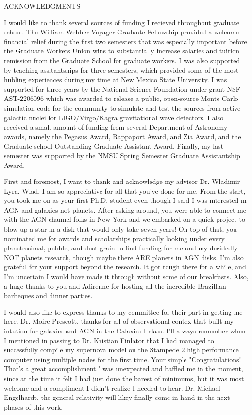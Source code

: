\begin{center}
ACKNOWLEDGMENTS
\end{center}


I would like to thank several sources of funding I recieved throughout graduate school.
The William Webber Voyager Graduate Fellowship provided a welcome financial relief during the first two semesters that was especially important before the Graduate Workers Union wins to substantially increase salaries and tuition remission from the Graduate School for graduate workers.
I was also supported by teaching assitantships for three semesters, which provided some of the most hubling experiences during my time at New Mexico State University.
I was supported for three years by the National Science Foundation under grant NSF AST-2206096 which was awarded to release a public, open-source Monte Carlo simulation code for the community to simulate and test the sources from active galactic nuclei for LIGO/Virgo/Kagra gravitational wave detectors.
I also received a small amount of funding from several Department of Astronomy awards, namely the Pegasus Award, Rappaport Award, and Zia Award, and the Graduate school Outstanding Graduate Assistant Award.
Finally, my last semester was supported by the NMSU Spring Semester Graduate Assistantship Award.

First and foremost, I want to thank and acknowledge my advisor Dr. Wladimir Lyra. Wlad, I am so appreciative for all that you've done for me.
From the start, you took me on as your first Ph.D. student even though I said I was interested in AGN and galaxies not planets.
After asking around, you were able to connect me with the AGN channel folks in New York and we embarked on a quick project to blow up a star in a disk that would only take seven years!
On top of that, you nominated me for awards and scholarships practically looking under every planetessimal, pebble, and dust grain to find funding for me and my decidedly NOT planets research, though maybe there ARE planets in AGN disks.
I'm also grateful for your support beyond the research.
It got tough there for a while, and I'm uncertain I would have made it through without some of our breakfasts.
Also, a huge thanks to you and Adirenne for hosting all the incredible Brazillian barbeques and dinner parties.

I would also like to express thanks to my committee for their part in getting me here.
Dr. Moire Prescott, thanks for all of observational contex that built my intution for galaxies and AGN in the Galaxies I class.
I'll always remember when I mentioned in passing to Dr. Kristian Finlator that I had managed to successfully compile my supernova model on the Stampede 2 high performance computer using multiple nodes for the first time.
Your simple "Congratulations! That's a great accomplishment." was unexpected and baffled me in the moment, since at the time it felt I had just done the barest of minimums, but it was most welcome and a compliment I didn't realize I needed to hear.
Dr. Michael Engelhardt, the general relativity will likey finally come in hand in the next phases of this work.

